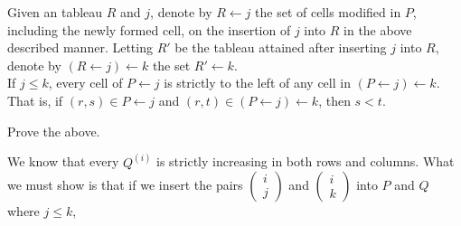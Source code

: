 	\begin{flem}
		Given an tableau $R$ and $j$, denote by $R \leftarrow j$ the set of cells modified in $P$, including the newly formed cell, on the insertion of $j$ into $R$ in the above described manner. Letting $R'$ be the tableau attained after inserting $j$ into $R$, denote by $(R \leftarrow j) \leftarrow k$ the set $R' \leftarrow k$.\\
		If $j \le k$, every cell of $P \leftarrow j$ is strictly to the left of any cell in $(P \leftarrow j) \leftarrow k$. That is, if $(r,s) \in P\leftarrow j$ and $(r,t) \in (P \leftarrow j) \leftarrow k$, then $s < t$.
	\end{flem}

	\begin{exercise}
		Prove the above.
	\end{exercise}

	We know that every $Q^{(i)}$ is strictly increasing in both rows and columns. What we must show is that if we insert the pairs $\begin{pmatrix} i \\ j \end{pmatrix}$ and $\begin{pmatrix} i \\ k \end{pmatrix}$ into $P$ and $Q$ where $j \le k$, 

